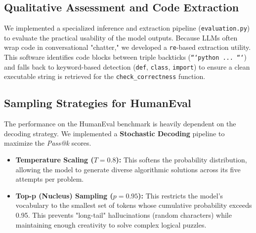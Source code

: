 \subsection{Qualitative Assessment and Code Extraction}
We implemented a specialized inference and extraction pipeline (\texttt{evaluation.py}) to evaluate the practical usability of the model outputs.
Because LLMs often wrap code in conversational "chatter," we developed a \texttt{re}-based extraction utility. This software identifies code blocks between triple backticks (\texttt{```python ... ```}) and falls back to keyword-based detection (\texttt{def}, \texttt{class}, \texttt{import}) to ensure a clean executable string is retrieved for the \texttt{check\_correctness} function.

\subsection{Sampling Strategies for HumanEval}
The performance on the HumanEval benchmark is heavily dependent on the decoding strategy. We implemented a \textbf{Stochastic Decoding} pipeline to maximize the \textit{Pass@k} scores.
\begin{itemize}
\item \textbf{Temperature Scaling ($T=0.8$):} This softens the probability distribution, allowing the model to generate diverse algorithmic solutions across its five attempts per problem.
\item \textbf{Top-p (Nucleus) Sampling ($p=0.95$):} This restricts the model's vocabulary to the smallest set of tokens whose cumulative probability exceeds 0.95. This prevents "long-tail" hallucinations (random characters) while maintaining enough creativity to solve complex logical puzzles.
\end{itemize}

